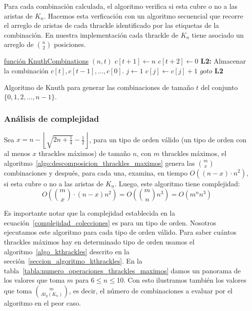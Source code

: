   Para cada combinación calculada, el algoritmo verifica si esta cubre o no a las aristas
  de $K_n$. Hacemos esta verficación con un algoritmo secuencial que recorre el arreglo
  de aristas de cada thrackle identificado por las etiquetas de la combinación. En
  nuestra implementación cada thrackle de $K_n$ tiene asociado un arreglo de
  $\binom{n}{2}$ posiciones.
  \begin{algorithm}[h]
    \DontPrintSemicolon
    \underline{función KnuthCombinations} $(n,t)$\;
    $c[t+1] \gets n$\;
    $c[t+2] \gets 0$\;
    \textbf{L2: } \;
    Almacenar la combinación $c[t],c[t-1],\dots,c[0]$. \;
    $j \gets 1$ \;
    $c[j] \gets c[j]+1$ \;
    $goto$\textbf{ L2}\;
    \caption{Algoritmo de Knuth para generar las combinaciones de tamaño $t$ del conjunto $\{0,1,2,\dots,n-1\}$.}
    \label{algo:knuth_combinaciones}
  \end{algorithm}


  \subsubsection{Análisis de complejidad}
  Sea $x=n - \left\lfloor\sqrt{2n + \frac{1}{4}} - \frac{1}{2}\right\rfloor$, para un tipo de orden válido (un tipo de orden con al menos $x$ thrackles máximos) de tamaño $n$, con $m$ thrackles máximos, el algoritmo~\ref{algo:descomposicion_thrackles_maximos} genera las
  $\binom{m}{x}$ combinaciones y después, para cada una, examina, en tiempo $O((n - x) \cdot n^2)$, si esta cubre o no a las aristas de $K_n$. Luego, este algoritmo tiene complejidad:
  \begin{equation}\displaystyle
    O\left(\binom{m}{x}\cdot ( n- x ) n^2 \right) = O \left( \binom{m}{n} n^3 \right) = O(m^n n^3)
    \label{complejidad_colecciones}
  \end{equation}

  Es importante notar que la complejidad establecida en la
  ecuación~\ref{complejidad_colecciones} es para un tipo de orden. Nosotros
  ejecutamos este algoritmo para cada tipo de orden válido. Para saber cuántos thrackles
  máximos hay en determinado tipo de orden usamos el algoritmo~\ref{algo_kthrackles} descrito en la
  sección~\ref{seccion_algoritmo_kthrackles}. En la
  tabla~\ref{tabla:numero_operaciones_thrackles_maximos} damos un panorama de los valores que toma
  $m$ para $6\leq n \leq 10$. Con esto ilustramos también los valores que toma
  $\binom{m}{At_g(K_n)}$, es decir, el número de  combinaciones a evaluar por el algoritmo en el
  peor caso.

